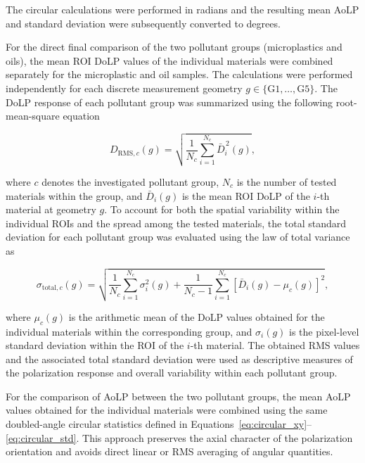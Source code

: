 \documentclass[pdflatex,sn-apa]{sn-jnl}
\begin{document}
\noindent
The circular calculations were performed in radians and the resulting mean AoLP and standard deviation were subsequently converted to degrees.

For the direct final comparison of the two pollutant groups (microplastics and oils), the mean ROI DoLP values of the individual materials were combined separately for the microplastic and oil samples. The calculations were performed independently for each discrete measurement geometry $g\in\{\mathrm{G1},\ldots,\mathrm{G5}\}$. The DoLP response of each pollutant group was summarized using the following root-mean-square equation

\begin{equation}
 D_{\mathrm{RMS},c}(g)=
 \sqrt{\frac{1}{N_c}\sum_{i=1}^{N_c}\bar{D}_{i}^{\,2}(g)},
 \label{eq:rms_dolp}
\end{equation}

\noindent
where $c$ denotes the investigated pollutant group, $N_c$ is the number of tested materials within the group, and $\bar{D}_{i}(g)$ is the mean ROI DoLP of the $i$-th material at geometry $g$. To account for both the spatial variability within the individual ROIs and the spread among the tested materials, the total standard deviation for each pollutant group was evaluated using the law of total variance as

\begin{equation}
 \sigma_{\mathrm{total},c}(g)=
 \sqrt{
 \frac{1}{N_c} \sum_{i=1}^{N_c} \sigma_{i}^2(g) +
 \frac{1}{N_c-1}
 \sum_{i=1}^{N_c}
 \left[\bar{D}_{i}(g)-\mu_c(g)\right]^2},
 \label{eq:class_sd}
\end{equation}

\noindent
where $\mu_c(g)$ is the arithmetic mean of the DoLP values obtained for the individual materials within the corresponding group, and $\sigma_i(g)$ is the pixel-level standard deviation within the ROI of the $i$-th material. The obtained RMS values and the associated total standard deviation were used as descriptive measures of the polarization response and overall variability within each pollutant group.

For the comparison of AoLP between the two pollutant groups, the mean AoLP values obtained for the individual materials were combined using the same doubled-angle circular statistics defined in Equations~\eqref{eq:circular_xy}--\eqref{eq:circular_std}. This approach preserves the axial character of the polarization orientation and avoids direct linear or RMS averaging of angular quantities.
\end{document}
